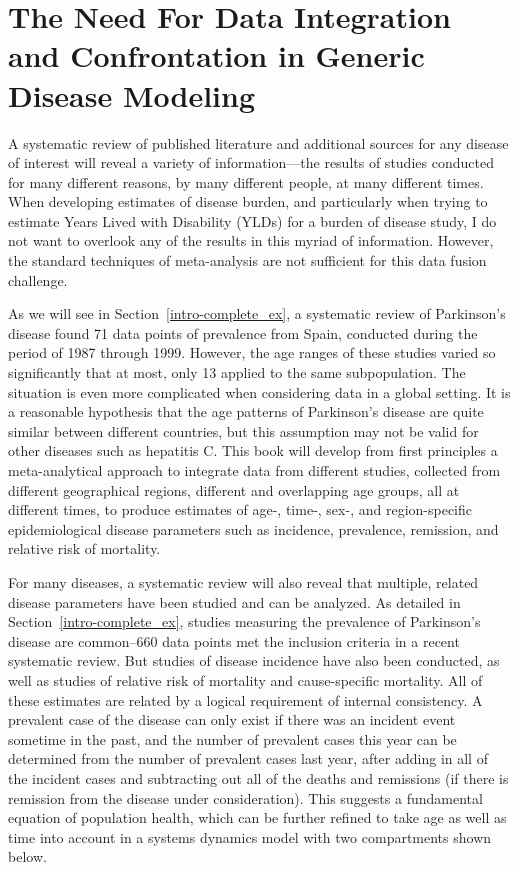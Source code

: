 \section[Need for Confrontation]{The Need For Data Integration and Confrontation in Generic Disease Modeling}

A systematic review of published literature and additional sources for
any disease of interest will reveal a variety of information---the
results of studies conducted for many different reasons, by many
different people, at many different times. When developing estimates
of disease burden, and particularly when trying to estimate Years
Lived with Disability (YLDs) for a burden of disease study, I do not
want to overlook any of the results in this myriad of
information. However, the standard techniques of meta-analysis are
not sufficient for this data fusion challenge.

As we will see in Section~\ref{intro-complete_ex}, a systematic review of Parkinson's disease found 71 data points of prevalence from Spain,
conducted during the period of 1987 through 1999.  However, the age ranges of these
studies varied so significantly that at most, only 13 applied to the
same subpopulation.  The situation is even more complicated when
considering data in a global setting. It is a reasonable hypothesis
that the age patterns of Parkinson's disease are quite similar between different countries, but this assumption may not be valid for other diseases such as hepatitis C.
This book will develop from first principles a
meta-analytical approach to integrate data from different studies,
collected from different geographical regions, different and
overlapping age groups, all at different times, to produce estimates
of age-, time-, sex-, and region-specific epidemiological disease
parameters such as incidence, prevalence, remission, and relative risk
of mortality.

For many diseases, a systematic review will also reveal that multiple,
related disease parameters have been studied and can be analyzed. As
detailed in Section~\ref{intro-complete_ex}, studies measuring the prevalence of
Parkinson's disease are common--660 data points met the
inclusion criteria in a recent systematic review. But studies of
disease incidence have also been conducted, as well as studies of
relative risk of mortality and cause-specific mortality. All of these
estimates are related by a logical requirement of internal
consistency.  A prevalent case of the disease can only exist if there
was an incident event sometime in the past, and the number of
prevalent cases this year can be determined from the number of
prevalent cases last year, after adding in all of the incident cases
and subtracting out all of the deaths and remissions (if there is
remission from the disease under consideration).  This suggests a
fundamental equation of population health, which can be further
refined to take age as well as time into account in a systems dynamics
model with two compartments shown below.

